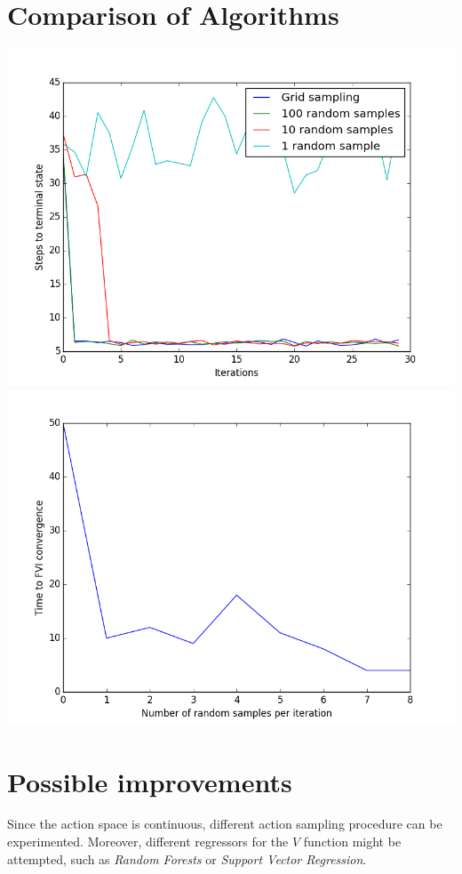 \documentclass[a4paper, 12pt]{article}
\begin{document}
\section*{Comparison of Algorithms}
\includegraphics[scale=0.7]{convergence.png}
\includegraphics[scale=0.7]{n_samples.png}

\section*{Possible improvements}

Since the action space is continuous, different action sampling procedure
can be experimented. Moreover, different regressors for the 
$V$ function might be attempted,
such as \emph{Random Forests} or \emph{Support Vector Regression}.
\end{document}
